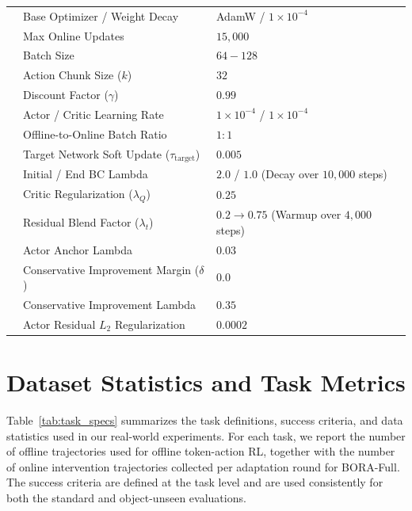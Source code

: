 \documentclass{article}
\begin{document}
\begin{table}[htbp]
\begin{tabularx}{\textwidth}{@{}l l X@{}}
& Base Optimizer / Weight Decay & AdamW / $1 \times 10^{-4}$ \\
& Max Online Updates & $15,000$ \\
& Batch Size & $64-128$ \\
& Action Chunk Size ($k$) & $32$ \\
& Discount Factor ($\gamma$) & $0.99$ \\
& Actor / Critic Learning Rate & $1 \times 10^{-4}$ / $1 \times 10^{-4}$ \\
& Offline-to-Online Batch Ratio & $1:1$ \\
& Target Network Soft Update ($\tau_{\text{target}}$) & $0.005$ \\
& Initial / End BC Lambda & $2.0$ / $1.0$ (Decay over $10,000$ steps) \\
& Critic Regularization ($\lambda_{Q}$) & $0.25$ \\
& Residual Blend Factor ($\lambda_t$) & $0.2 \rightarrow 0.75$ (Warmup over $4,000$ steps) \\
& Actor Anchor Lambda & $0.03$ \\
& Conservative Improvement Margin ($\delta$) & $0.0$ \\
& Conservative Improvement Lambda & $0.35$ \\
& Actor Residual $L_2$ Regularization & $0.0002$ \\
\bottomrule
\end{tabularx}
\end{table}

\newpage
\section{Dataset Statistics and Task Metrics}
\label{app:dataset}


Table~\ref{tab:task_specs} summarizes the task definitions, success criteria, and data statistics used in our real-world experiments.
For each task, we report the number of offline trajectories used for offline token-action RL, together with the number of online intervention trajectories collected per adaptation round for BORA-Full.
The success criteria are defined at the task level and are used consistently for both the standard and object-unseen evaluations.
\end{document}
